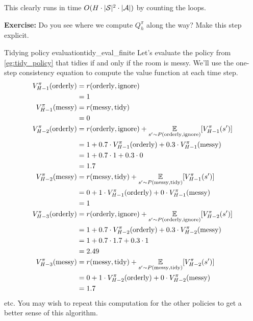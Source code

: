 \documentclass[\main/main]{subfiles}
\begin{document}
This clearly runs in time $O(H \cdot |\mathcal{S}|^2 \cdot |\mathcal{A}|)$ by counting the loops.

\textbf{Exercise:} Do you see where we compute $Q^\pi_h$ along the way? Make this step explicit.


\begin{example}{Tidying policy evaluation}{tidy_eval_finite}
    Let's evaluate the policy from \ref{eg:tidy_policy} that tidies if and only if the room is messy. We'll use the one-step consistency equation to compute the value function at each time step.
    \begin{align*}
        V_{H-1}^\pi(\text{orderly}) &= r(\text{orderly}, \text{ignore}) \\
        &= 1 \\
        V_{H-1}^\pi(\text{messy}) &= r(\text{messy}, \text{tidy}) \\
        &= 0 \\
        V_{H-2}^\pi(\text{orderly}) &= r(\text{orderly}, \text{ignore}) + \operatorname*{\mathbb{E}}_{s' \sim P(\text{orderly}, \text{ignore})} [V_{H-1}^\pi(s')] \\
        &= 1 + 0.7 \cdot V_{H-1}^{\pi}(\text{orderly}) + 0.3 \cdot V_{H-1}^{\pi}(\text{messy}) \\
        &= 1 + 0.7 \cdot 1 + 0.3 \cdot 0 \\
        &= 1.7 \\
        V_{H-2}^\pi(\text{messy}) &= r(\text{messy}, \text{tidy}) + \operatorname*{\mathbb{E}}_{s' \sim P(\text{messy}, \text{tidy})} [V_{H-1}^\pi(s')] \\
        &= 0 + 1 \cdot V_{H-1}^{\pi}(\text{orderly}) + 0 \cdot V_{H-1}^{\pi}(\text{messy}) \\
        &= 1 \\
        V_{H-3}^\pi(\text{orderly}) &= r(\text{orderly}, \text{ignore}) + \operatorname*{\mathbb{E}}_{s' \sim P(\text{orderly}, \text{ignore})} [V_{H-2}^\pi(s')] \\
        &= 1 + 0.7 \cdot V_{H-2}^{\pi}(\text{orderly}) + 0.3 \cdot V_{H-2}^{\pi}(\text{messy}) \\
        &= 1 + 0.7 \cdot 1.7 + 0.3 \cdot 1 \\
        &= 2.49 \\
        V_{H-3}^\pi(\text{messy}) &= r(\text{messy}, \text{tidy}) + \operatorname*{\mathbb{E}}_{s' \sim P(\text{messy}, \text{tidy})} [V_{H-2}^\pi(s')] \\
        &= 0 + 1 \cdot V_{H-2}^{\pi}(\text{orderly}) + 0 \cdot V_{H-2}^{\pi}(\text{messy}) \\
        &= 1.7
    \end{align*}
    etc. You may wish to repeat this computation for the other policies to get a better sense of this algorithm.
\end{example}
\end{document}
